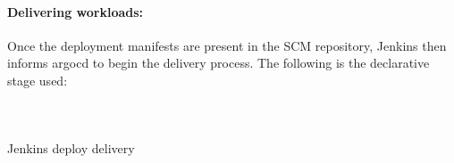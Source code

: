 
\paragraph{Delivering workloads: }

Once the deployment manifests are present in the SCM repository, Jenkins then informs argocd to begin the delivery process. The following is the declarative stage used: 

\begin{listing}[H]
    \inputminted[firstline=1,lastline=10]{Dockerfile}{codeListing/Jenkinsfile_deploy_delivery}
\end{listing}

\begin{listing}[H]
    \inputminted[firstline=11,lastline=45]{Dockerfile}{codeListing/Jenkinsfile_deploy_delivery}
\end{listing}

\begin{listing}[H]
    \inputminted[firstline=46]{Dockerfile}{codeListing/Jenkinsfile_deploy_delivery}
    \caption{Jenkins deploy delivery}
    \label{lst:jenkinsfile_deploy_delivery}
\end{listing}